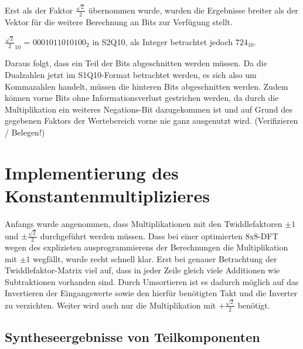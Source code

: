 Erst als der Faktor $\frac{\sqrt{2}}{2}$ übernommen wurde, wurden die Ergebnisse breiter als der Vektor für die weitere Berechnung an Bits zur Verfügung stellt.

${\frac{\sqrt{2}}{2}}_{10}$ = $0001011010100_2$ in S2Q10, als Integer betrachtet jedoch $724_{10}$.

Daraus folgt, dass ein Teil der Bits abgeschnitten werden müssen. Da die Dualzahlen jetzt im S1Q10-Format betrachtet werden, es sich also um Kommazahlen handelt,
müssen die hinteren Bits abgeschnitten werden. Zudem können vorne Bits ohne Informationsverlust gestrichen werden, da durch die Multiplikation ein weiteres 
Negations-Bit dazugekommen ist und auf Grund des gegebenen Faktors der Wertebereich vorne nie ganz ausgenutzt wird. (Verifizieren / Belegen!)


\section{Implementierung des Konstantenmultiplizieres}\label{sec:Konstantenmultiplizierer}

Anfangs wurde angenommen, dass Multiplikationen mit den Twiddlefaktoren $\pm 1$ und $\pm\frac{\sqrt{2}}{2}$ durchgeführt werden müssen. 
Dass bei einer optimierten 8x8-DFT wegen des explizieten ausprogrammierens der Berechnungen die Multiplikation mit $\pm1$ wegfällt, wurde recht schnell klar.
Erst bei genauer Betrachtung der Twiddlefaktor-Matrix viel auf, dass in jeder Zeile gleich viele Additionen wie Subtraktionen vorhanden sind. Durch Umsortieren 
ist es dadurch möglich auf das Invertieren der Eingangswerte sowie den hierfür benötigten Takt und die Inverter zu verzichten. Weiter wird auch nur die Multiplikation
mit $+\frac{\sqrt{2}}{2}$ benötigt.

\subsection{Syntheseergebnisse von Teilkomponenten}\label{sec:Syntheseergebnisse}

